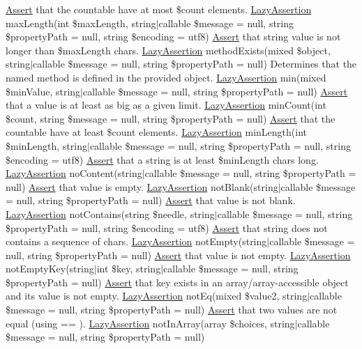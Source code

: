 \mbox{\hyperlink{class_assert_1_1_assert}{Assert}} that the countable have at most \$count elements.  \mbox{\hyperlink{class_assert_1_1_lazy_assertion}{Lazy\+Assertion}} max\+Length(int \$max\+Length, string$\vert$callable \$message = null, string \$property\+Path = null, string \$encoding = \textquotesingle{}utf8\textquotesingle{}) \mbox{\hyperlink{class_assert_1_1_assert}{Assert}} that string value is not longer than \$max\+Length chars.  \mbox{\hyperlink{class_assert_1_1_lazy_assertion}{Lazy\+Assertion}} method\+Exists(mixed \$object, string$\vert$callable \$message = null, string \$property\+Path = null) Determines that the named method is defined in the provided object.  \mbox{\hyperlink{class_assert_1_1_lazy_assertion}{Lazy\+Assertion}} min(mixed \$min\+Value, string$\vert$callable \$message = null, string \$property\+Path = null) \mbox{\hyperlink{class_assert_1_1_assert}{Assert}} that a value is at least as big as a given limit.  \mbox{\hyperlink{class_assert_1_1_lazy_assertion}{Lazy\+Assertion}} min\+Count(int \$count, string \$message = null, string \$property\+Path = null) \mbox{\hyperlink{class_assert_1_1_assert}{Assert}} that the countable have at least \$count elements.  \mbox{\hyperlink{class_assert_1_1_lazy_assertion}{Lazy\+Assertion}} min\+Length(int \$min\+Length, string$\vert$callable \$message = null, string \$property\+Path = null, string \$encoding = \textquotesingle{}utf8\textquotesingle{}) \mbox{\hyperlink{class_assert_1_1_assert}{Assert}} that a string is at least \$min\+Length chars long.  \mbox{\hyperlink{class_assert_1_1_lazy_assertion}{Lazy\+Assertion}} no\+Content(string$\vert$callable \$message = null, string \$property\+Path = null) \mbox{\hyperlink{class_assert_1_1_assert}{Assert}} that value is empty.  \mbox{\hyperlink{class_assert_1_1_lazy_assertion}{Lazy\+Assertion}} not\+Blank(string$\vert$callable \$message = null, string \$property\+Path = null) \mbox{\hyperlink{class_assert_1_1_assert}{Assert}} that value is not blank.  \mbox{\hyperlink{class_assert_1_1_lazy_assertion}{Lazy\+Assertion}} not\+Contains(string \$needle, string$\vert$callable \$message = null, string \$property\+Path = null, string \$encoding = \textquotesingle{}utf8\textquotesingle{}) \mbox{\hyperlink{class_assert_1_1_assert}{Assert}} that string does not contains a sequence of chars.  \mbox{\hyperlink{class_assert_1_1_lazy_assertion}{Lazy\+Assertion}} not\+Empty(string$\vert$callable \$message = null, string \$property\+Path = null) \mbox{\hyperlink{class_assert_1_1_assert}{Assert}} that value is not empty.  \mbox{\hyperlink{class_assert_1_1_lazy_assertion}{Lazy\+Assertion}} not\+Empty\+Key(string$\vert$int \$key, string$\vert$callable \$message = null, string \$property\+Path = null) \mbox{\hyperlink{class_assert_1_1_assert}{Assert}} that key exists in an array/array-\/accessible object and its value is not empty.  \mbox{\hyperlink{class_assert_1_1_lazy_assertion}{Lazy\+Assertion}} not\+Eq(mixed \$value2, string$\vert$callable \$message = null, string \$property\+Path = null) \mbox{\hyperlink{class_assert_1_1_assert}{Assert}} that two values are not equal (using == ).  \mbox{\hyperlink{class_assert_1_1_lazy_assertion}{Lazy\+Assertion}} not\+In\+Array(array \$choices, string$\vert$callable \$message = null, string \$property\+Path = null) 
